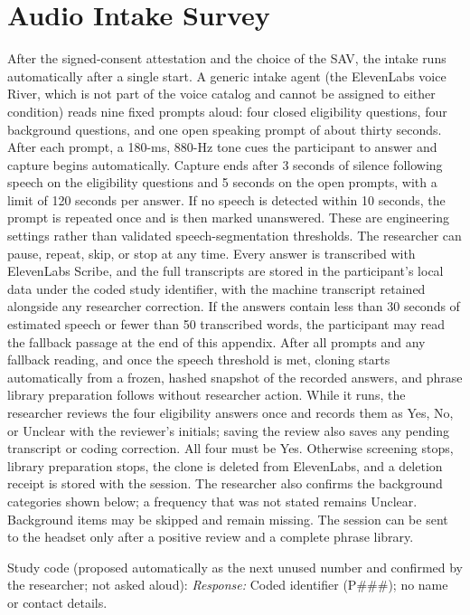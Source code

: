 \section{Audio Intake Survey}
After the signed-consent attestation and the choice of the SAV, the intake runs automatically after a single start. A generic intake agent (the ElevenLabs voice River, which is not part of the voice catalog and cannot be assigned to either condition) reads nine fixed prompts aloud: four closed eligibility questions, four background questions, and one open speaking prompt of about thirty seconds. After each prompt, a 180-ms, 880-Hz tone cues the participant to answer and capture begins automatically. Capture ends after 3 seconds of silence following speech on the eligibility questions and 5 seconds on the open prompts, with a limit of 120 seconds per answer. If no speech is detected within 10 seconds, the prompt is repeated once and is then marked unanswered. These are engineering settings rather than validated speech-segmentation thresholds. The researcher can pause, repeat, skip, or stop at any time. Every answer is transcribed with ElevenLabs Scribe, and the full transcripts are stored in the participant's local data under the coded study identifier, with the machine transcript retained alongside any researcher correction. If the answers contain less than 30 seconds of estimated speech or fewer than 50 transcribed words, the participant may read the fallback passage at the end of this appendix. After all prompts and any fallback reading, and once the speech threshold is met, cloning starts automatically from a frozen, hashed snapshot of the recorded answers, and phrase library preparation follows without researcher action. While it runs, the researcher reviews the four eligibility answers once and records them as Yes, No, or Unclear with the reviewer's initials; saving the review also saves any pending transcript or coding correction. All four must be Yes. Otherwise screening stops, library preparation stops, the clone is deleted from ElevenLabs, and a deletion receipt is stored with the session. The researcher also confirms the background categories shown below; a frequency that was not stated remains Unclear. Background items may be skipped and remain missing. The session can be sent to the headset only after a positive review and a complete phrase library.

\par\medskip\noindent
Study code (proposed automatically as the next unused number and confirmed by the researcher; not asked aloud):
\textit{Response:} Coded identifier (P\#\#\#); no name or contact details.\surveywrite

